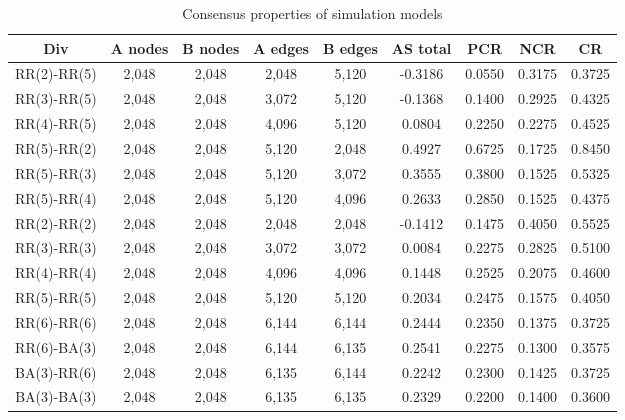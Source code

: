 \begin{table}[!htb]
	\centering
    \caption{Consensus properties of simulation models}
	\label{Consensus properties of Simulation Models}
	\begin{center}
		\begin{tabular}{c|c|c|c|c|c|c|c|c} \hline\hline
			Div                    & A nodes& B nodes & A edges & B edges & AS total  & PCR    & NCR    & CR       \\ \hline \hline
			RR(2)-RR(5)            & 2,048  & 2,048   & 2,048   & 5,120   & -0.3186   & 0.0550 & 0.3175 & 0.3725   \\ \hline
			RR(3)-RR(5)            & 2,048  & 2,048   & 3,072   & 5,120   & -0.1368   & 0.1400 & 0.2925 & 0.4325   \\ \hline
			RR(4)-RR(5)            & 2,048  & 2,048   & 4,096   & 5,120   &  0.0804   & 0.2250 & 0.2275 & 0.4525   \\ \hline
			RR(5)-RR(2)            & 2,048 	& 2,048   & 5,120   & 2,048   &  0.4927   & 0.6725 & 0.1725 & 0.8450   \\ \hline	
			RR(5)-RR(3)            & 2,048 	& 2,048   & 5,120   & 3,072   &  0.3555   & 0.3800 & 0.1525 & 0.5325   \\ \hline
			RR(5)-RR(4)            & 2,048  & 2,048   & 5,120   & 4,096   &  0.2633   & 0.2850 & 0.1525 & 0.4375   \\ \hline
			RR(2)-RR(2)            & 2,048  & 2,048   & 2,048   & 2,048   & -0.1412   & 0.1475 & 0.4050 & 0.5525   \\ \hline
			RR(3)-RR(3)            & 2,048  & 2,048   & 3,072   & 3,072   &  0.0084   & 0.2275 & 0.2825 & 0.5100   \\ \hline
			RR(4)-RR(4)            & 2,048  & 2,048   & 4,096   & 4,096   &  0.1448   & 0.2525 & 0.2075 & 0.4600   \\ \hline
			RR(5)-RR(5)            & 2,048  & 2,048   & 5,120   & 5,120   &  0.2034   & 0.2475 & 0.1575 & 0.4050   \\ \hline
			RR(6)-RR(6)            & 2,048  & 2,048   & 6,144   & 6,144   &  0.2444   & 0.2350 & 0.1375 & 0.3725   \\ \hline
			RR(6)-BA(3)            & 2,048 	& 2,048   & 6,144   & 6,135   &  0.2541   & 0.2275 & 0.1300 & 0.3575   \\ \hline 
			BA(3)-RR(6)            & 2,048 	& 2,048   & 6,135   & 6,144   &  0.2242   & 0.2300 & 0.1425 & 0.3725   \\ \hline
			BA(3)-BA(3)            & 2,048 	& 2,048   & 6,135   & 6,135   &  0.2329   & 0.2200 & 0.1400 & 0.3600   \\ \hline

\end{tabular}
\end{center}
\end{table}
